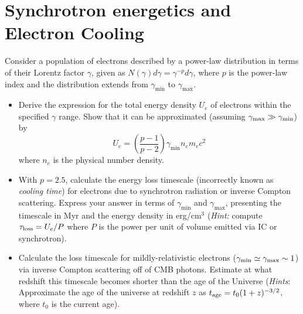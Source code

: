 \section{Synchrotron energetics and Electron Cooling}

Consider a population of electrons described by a power-law distribution in terms of their Lorentz factor $\gamma$, given as $N(\gamma)d\gamma = \gamma^{-p}d\gamma$, where $p$ is the power-law index and the distribution extends from $\gamma_{\text{min}}$ to $\gamma_{\text{max}}$.

\begin{itemize}
\item Derive the expression for the total energy density $U_e$ of electrons within the specified $\gamma$ range. Show that it can be approximated (assuming $\gamma_{\rm max} \gg \gamma_{\rm min}$) by $$U_e = \left(\frac{p-1}{p-2}\right) \gamma_{\text{min}} n_e m_e c^2$$
%
where $n_e$ is the physical number density.

\item With $p = 2.5$, calculate the energy loss timescale (incorrectly known as \emph{cooling time}) for electrons due to synchrotron radiation or inverse Compton scattering. Express your answer in terms of $\gamma_{\text{min}}$ and $\gamma_{\text{max}}$, presenting the timescale in Myr and the energy density in erg/cm$^3$ (\emph{Hint:} compute $\tau_{\rm loss} = U_e / P$ where $P$ is the power per unit of volume emitted via IC or synchrotron).

\item Calculate the loss timescale for mildly-relativistic electrons ($\gamma_{\rm min} \simeq \gamma_{\rm max} \sim 1$) via inverse Compton scattering off of CMB photons. Estimate at what redshift this timescale becomes shorter than the age of the Universe (\emph{Hints}: Approximate the age of the universe at redshift $z$ as $t_{\rm age} = t_0 (1+z)^{-3/2}$, where $t_0$ is the current age).

\end{itemize}